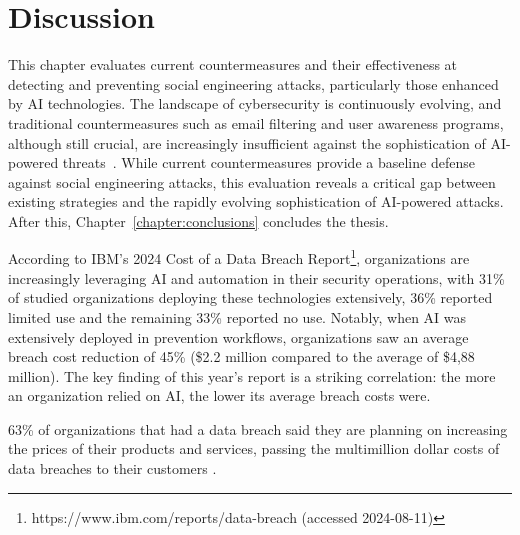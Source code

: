 


\chapter{Discussion\label{chapter:discussion}}
\begin{comment}

    - OpenAI attempts to control how ChatGPT etc are used
    - Efficacy of EU and other level regulations
    - Instagram flagging content that might've been generated with AI (this is futile in the future?)

\end{comment}

This chapter evaluates current countermeasures and their effectiveness at detecting and preventing social engineering attacks, particularly those enhanced by AI technologies. The landscape of cybersecurity is continuously evolving, and traditional countermeasures such as email filtering and user awareness programs, although still crucial, are increasingly insufficient against the sophistication of AI-powered threats~\citep{fakhouri_AI_Driven_Solutions_SE_Attacks_2024}. While current countermeasures provide a baseline defense against social engineering attacks, this evaluation reveals a critical gap between existing strategies and the rapidly evolving sophistication of AI-powered attacks. After this, Chapter~\ref{chapter:conclusions} concludes the thesis.






According to IBM's 2024 Cost of a Data Breach Report\footnote{https://www.ibm.com/reports/data-breach (accessed 2024-08-11)}, organizations are increasingly leveraging AI and automation in their security operations, with 31\% of studied organizations deploying these technologies extensively, 36\% reported limited use and the remaining 33\% reported no use. Notably, when AI was extensively deployed in prevention workflows, organizations saw an average breach cost reduction of 45\% (\$2.2 million compared to the average of \$4,88 million). The key finding of this year's report is a striking correlation: the more an organization relied on AI, the lower its average breach costs were.

63\% of organizations that had a data breach said they are planning on increasing the prices of their products and services, passing the multimillion dollar costs of data breaches to their customers \citep{ibm_Cost_Data_Breach_Report_2024}.





